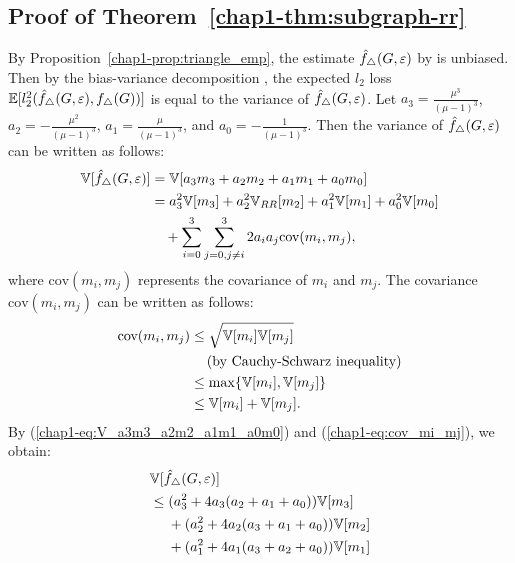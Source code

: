 {\subsection{Proof of Theorem~\ref{chap1-thm:subgraph-rr}}
\label{chap1-sub:proof_thm:subgraph-rr}
By Proposition~\ref{chap1-prop:triangle_emp}, the estimate $\hat{f}_{\triangle}(G, \varepsilon)$ by  is unbiased. 
Then by the bias-variance decomposition \cite{mlpp}, 
the expected $l_2$ loss $\mathbb{E}[l_2^2(\hat{f}_{\triangle}(G, \varepsilon), f_\triangle(G))]$ is equal to the variance of $\hat{f}_{\triangle}(G, \varepsilon)$. 
Let 
$a_3 = \frac{\mu^3}{(\mu-1)^3}$, 
$a_2 = - \frac{\mu^2}{(\mu-1)^3}$, 
$a_1 = \frac{\mu}{(\mu-1)^3}$, and 
$a_0 = - \frac{1}{(\mu-1)^3}$. 
Then the variance of $\hat{f}_{\triangle}(G, \varepsilon)$ can be written as follows:
\begin{align}
    \mathbb{V}[\hat{f}_{\triangle}(G, \varepsilon)] 
    &= \mathbb{V}[a_3 m_3 + a_2 m_2 + a_1 m_1 + a_0 m_0] \nonumber\\
    &= a_3^2 \mathbb{V}[m_3] + a_2^2 \mathbb{V}_{RR}[m_2] + a_1^2 \mathbb{V}[m_1] + a_0^2 \mathbb{V}[m_0] \nonumber\\
    &\hspace{3.5mm} + \sum_{i=0}^3 \sum_{j=0, j \ne i}^3 2a_i a_j \text{cov}(m_i, m_j),
    \label{chap1-eq:V_a3m3_a2m2_a1m1_a0m0}
\end{align}
where $\text{cov}(m_i, m_j)$ represents the covariance of $m_i$ and $m_j$. 
The covariance $\text{cov}(m_i, m_j)$ can be written as follows:
\begin{align}
    \text{cov}(m_i, m_j)
    &\leq \sqrt{\mathbb{V}[m_i] \mathbb{V}[m_j]} \nonumber\\
    &\hspace{4.2mm} (\text{by Cauchy-Schwarz inequality}) \nonumber\\
    &\leq  \max\{ \mathbb{V}[m_i], \mathbb{V}[m_j]\} \nonumber\\
    &\leq \mathbb{V}[m_i] + \mathbb{V}[m_j].
    \label{chap1-eq:cov_mi_mj}
\end{align}
By (\ref{chap1-eq:V_a3m3_a2m2_a1m1_a0m0}) and (\ref{chap1-eq:cov_mi_mj}), we obtain:
\begin{align}
    &\V[\hf_{\triangle}(G, \epsilon)] \nonumber\\
    &\leq (a_3^2 + 4a_3(a_2 + a_1 + a_0)) \V[m_3] \nonumber\\
    & \hspace{4.5mm} + (a_2^2 + 4a_2(a_3 + a_1 + a_0)) \V[m_2] \nonumber\\
    & \hspace{4.5mm} + (a_1^2 + 4a_1(a_3 + a_2 + a_0)) \V[m_1] \nonumber\\

\end{align}}
